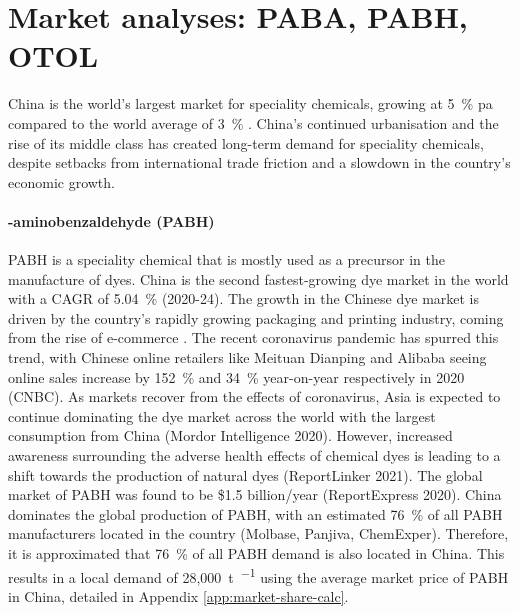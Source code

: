 \section{Market analyses: PABA, PABH, OTOL}
\label{sec:market-analysis}
China is the world’s largest market for speciality chemicals, growing at \SI{5}{\percent} pa compared to the world average of \SI{3}{\percent} \cite{blad_game_nodate}. China’s continued urbanisation and the rise of its middle class has created long-term demand for speciality chemicals, despite setbacks from international trade friction and a slowdown in the country’s economic growth.

\paragraph{\para-aminobenzaldehyde (PABH)}
PABH is a speciality chemical that is mostly used as a precursor in the manufacture of dyes. China is the second fastest-growing dye market in the world with a CAGR of \SI{5.04}{\percent} (2020-24). The growth in the Chinese dye market is driven by the country’s rapidly growing packaging and printing industry, coming from the rise of e-commerce \cite{reporl}. The recent coronavirus pandemic has spurred this trend, with Chinese online retailers like Meituan Dianping and Alibaba seeing online sales increase by \SI{152}{\percent} and \SI{34}{\percent} year-on-year respectively in 2020 (CNBC). As markets recover from the effects of coronavirus, Asia is expected to continue dominating the dye market across the world with the largest consumption from China (Mordor Intelligence 2020). However, increased awareness surrounding the adverse health effects of chemical dyes is leading to a shift towards the production of natural dyes (ReportLinker 2021). The global market of PABH was found to be \$1.5 billion/year (ReportExpress 2020). China dominates the global production of PABH, with an estimated \SI{76}{\percent} of all PABH manufacturers located in the country (Molbase, Panjiva, ChemExper). Therefore, it is approximated that \SI{76}{\percent} of all PABH demand is also located in China. This results in a local demand of 28,\SI{000}{\tonne\per\year} using the average market price of PABH in China, detailed in Appendix \ref{app:market-share-calc}.

